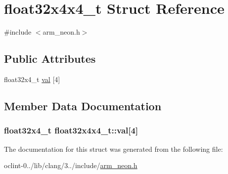 \hypertarget{structfloat32x4x4__t}{\section{float32x4x4\-\_\-t Struct Reference}
\label{structfloat32x4x4__t}
}


{\ttfamily \#include $<$arm\-\_\-neon.\-h$>$}

\subsection*{Public Attributes}
\begin{DoxyCompactItemize}
\item 
float32x4\-\_\-t \hyperlink{structfloat32x4x4__t_a97441604fc6524c3d974b4042aace3de}{val} \mbox{[}4\mbox{]}
\end{DoxyCompactItemize}


\subsection{Member Data Documentation}
\hypertarget{structfloat32x4x4__t_a97441604fc6524c3d974b4042aace3de}{
\subsubsection[{val}]{\setlength{\rightskip}{0pt plus 5cm}float32x4\-\_\-t float32x4x4\-\_\-t\-::val\mbox{[}4\mbox{]}}}\label{structfloat32x4x4__t_a97441604fc6524c3d974b4042aace3de}


The documentation for this struct was generated from the following file\-:\begin{DoxyCompactItemize}
\item 
oclint-\/0../lib/clang/3../include/\hyperlink{arm__neon_8h}{arm\-\_\-neon.\-h}\end{DoxyCompactItemize}
